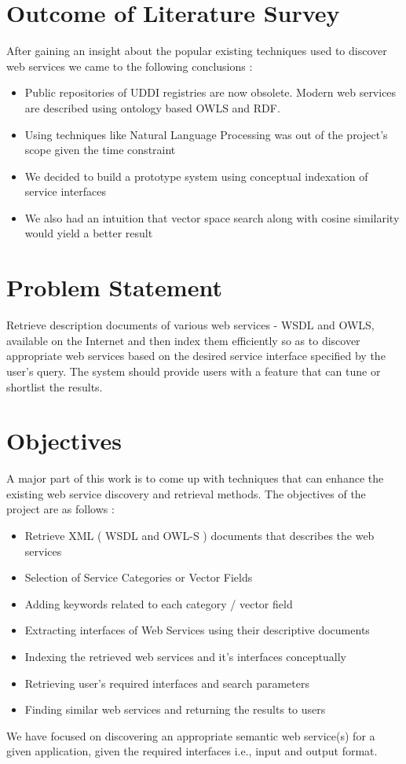 \documentclass[12pt, twoside]{book}
\begin{document}
\section{Outcome of Literature Survey}
After gaining an insight about the popular existing techniques used to discover web services we came to the following conclusions :
\begin{itemize}
 \item Public repositories of UDDI registries are now obsolete. Modern web services are described using ontology based OWLS and RDF.
 \item Using techniques like Natural Language Processing was out of the project's scope given the time constraint
 \item We decided to build a prototype system using conceptual indexation of service interfaces
 \item We also had an intuition that vector space search along with cosine similarity would yield a better result
\end{itemize}

\section{Problem Statement}
Retrieve description documents of various web services - WSDL and OWLS, available on the Internet and then index them efficiently so as to discover appropriate web services based on the desired service interface specified by the user's query. The system should provide users with a feature that can tune or shortlist the results.

\section{Objectives}
A major part of this work is to come up with techniques that can enhance the existing web service discovery and retrieval methods. The objectives of the project are as follows :
\begin{itemize}
 \item Retrieve XML ( WSDL and OWL-S ) documents that describes the web services
 \item Selection of Service Categories or Vector Fields
 \item Adding keywords related to each category / vector field
 \item Extracting interfaces of Web Services using their descriptive documents
 \item Indexing the retrieved web services and it's interfaces conceptually
 \item Retrieving user's required interfaces and search parameters
 \item Finding similar web services and returning the results to users
\end{itemize}
We have focused on discovering an appropriate semantic web service(s) for a given application, given the required interfaces i.e., input and output format. \\
\end{document}

